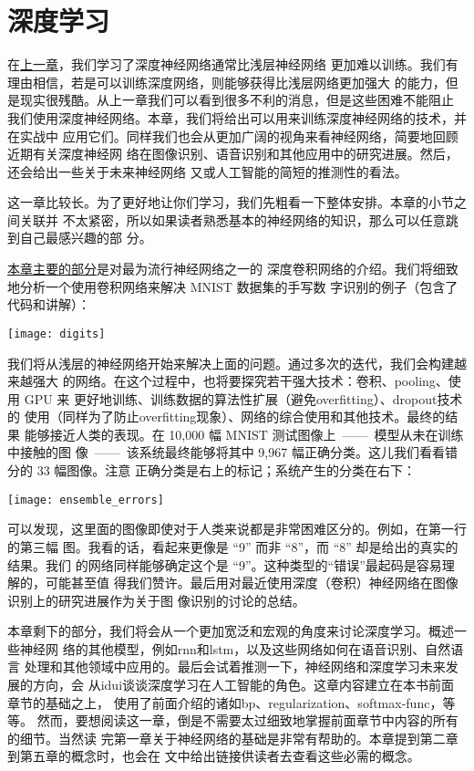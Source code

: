 
\chapter{深度学习}
\label{ch:Deeplearning}

在\hyperref[ch:WhyHardToTrain]{上一章}，我们学习了深度神经网络通常比浅层神经网络
更加难以训练。我们有理由相信，若是可以训练深度网络，则能够获得比浅层网络更加强大
的能力，但是现实很残酷。从上一章我们可以看到很多不利的消息，但是这些困难不能阻止
我们使用深度神经网络。本章，我们将给出可以用来训练深度神经网络的技术，并在实战中
应用它们。同样我们也会从更加广阔的视角来看神经网络，简要地回顾近期有关深度神经网
络在图像识别、语音识别和其他应用中的研究进展。然后，还会给出一些关于未来神经网络
又或人工智能的简短的推测性的看法。

这一章比较长。为了更好地让你们学习，我们先粗看一下整体安排。本章的小节之间关联并
不太紧密，所以如果读者熟悉基本的神经网络的知识，那么可以任意跳到自己最感兴趣的部
分。

\hyperref[sec:convolutional_networks]{本章主要的部分}是对最为流行神经网络之一的
深度卷积网络的介绍。我们将细致地分析一个使用卷积网络来解决 MNIST 数据集的手写数
字识别的例子（包含了代码和讲解）：
\begin{center}
  \texttt{[image: digits]}
\end{center}

我们将从浅层的神经网络开始来解决上面的问题。通过多次的迭代，我们会构建越来越强大
的网络。在这个过程中，也将要探究若干强大技术：卷积、\gls*{pooling}、使用 GPU 来
更好地训练、训练数据的算法性扩展（避免\gls*{overfitting}）、\gls*{dropout}技术的
使用（同样为了防止\gls*{overfitting}现象）、网络的综合使用和其他技术。最终的结果
能够接近人类的表现。在 10,000 幅 MNIST 测试图像上~——~模型从未在训练中接触的图
像~——~该系统最终能够将其中 9,967 幅正确分类。这儿我们看看错分的 33 幅图像。注意
正确分类是右上的标记；系统产生的分类在右下：
\begin{center}
  \texttt{[image: ensemble\_errors]}
\end{center}

可以发现，这里面的图像即使对于人类来说都是非常困难区分的。例如，在第一行的第三幅
图。我看的话，看起来更像是 “9” 而非 “8”，而 “8” 却是给出的真实的结果。我们
的网络同样能够确定这个是 “9”。这种类型的“错误”最起码是容易理解的，可能甚至值
得我们赞许。最后用对最近使用深度（卷积）神经网络在图像识别上的研究进展作为关于图
像识别的讨论的总结。

本章剩下的部分，我们将会从一个更加宽泛和宏观的角度来讨论深度学习。概述一些神经网
络的其他模型，例如\gls*{rnn}和\gls*{lstm}，以及这些网络如何在语音识别、自然语言
处理和其他领域中应用的。最后会试着推测一下，神经网络和深度学习未来发展的方向，会
从\gls*{idui}谈谈深度学习在人工智能的角色。这章内容建立在本书前面章节的基础之上，
使用了前面介绍的诸如\gls*{bp}、\gls*{regularization}、\gls*{softmax-func}，等等。
然而，要想阅读这一章，倒是不需要太过细致地掌握前面章节中内容的所有的细节。当然读
完第一章关于神经网络的基础是非常有帮助的。本章提到第二章到第五章的概念时，也会在
文中给出链接供读者去查看这些必需的概念。

